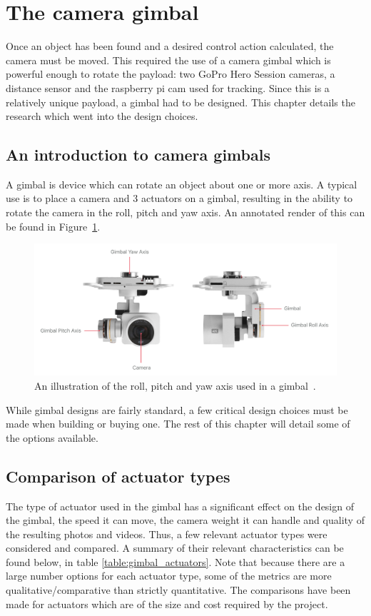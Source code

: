 \section{The camera gimbal}
Once an object has been found and a desired control action calculated, the camera must be moved. This required the use of a camera gimbal which is powerful enough to rotate the payload: two GoPro Hero Session cameras, a distance sensor and the raspberry pi cam used for tracking. Since this is a relatively unique payload, a gimbal had to be designed. This chapter details the research which went into the design choices.

\subsection{An introduction to camera gimbals}
A gimbal is device which can rotate an object about one or more axis. A typical use is to place a camera and 3 actuators on a gimbal, resulting in the ability to rotate the camera in the roll, pitch and yaw axis. An annotated render of this can be found in Figure~\ref{fig:roll_pitch_yaw_camera}.

\begin{figure}[h!]
  \centering
  \includegraphics[width=\textwidth]{literature_review/roll_pitch_yaw_gimbal.png}
  \caption{\label{fig:roll_pitch_yaw_camera} An illustration of the roll, pitch and yaw axis used in a gimbal~\cite{roll_pitch_yaw_camera}.}
\end{figure}

While gimbal designs are fairly standard, a few critical design choices must be made when building or buying one. The rest of this chapter will detail some of the options available.

\subsection{Comparison of actuator types}
The type of actuator used in the gimbal has a significant effect on the design of the gimbal, the speed it can move, the camera weight it can handle and quality of the resulting photos and videos. Thus, a few relevant actuator types were considered and compared. A summary of their relevant characteristics can be found below, in table \ref{table:gimbal_actuators}. Note that because there are a large number options for each actuator type, some of the metrics are more qualitative/comparative than strictly quantitative. The comparisons have been made for actuators which are of the size and cost required by the project.
\newline


